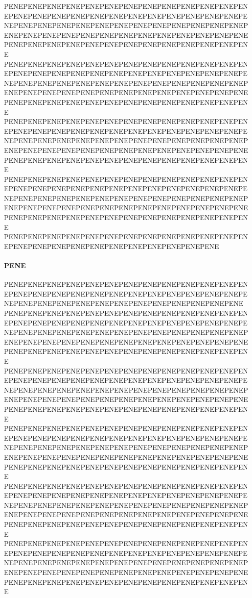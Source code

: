 PENEPENEPENEPENEPENEPENEPENEPENEPENEPENEPENEPENEPENEPENEPENEPENEPENEPENEPENEPENEPENEPENEPENEPENEPENEPENEPENEPENEPENEPENEPENEPENEPENEPENEPENEPENEPENEPENEPENEPENEPENEPENEPENEPENEPENEPENEPENEPENEPENEPENEPENEPENEPENEPENEPENEPENEPENEPENEPENEPENEPENEPENEPENEPENE
PENEPENEPENEPENEPENEPENEPENEPENEPENEPENEPENEPENEPENEPENEPENEPENEPENEPENEPENEPENEPENEPENEPENEPENEPENEPENEPENEPENEPENEPENEPENEPENEPENEPENEPENEPENEPENEPENEPENEPENEPENEPENEPENEPENEPENEPENEPENEPENEPENEPENEPENEPENEPENEPENEPENEPENEPENEPENEPENEPENEPENEPENEPENEPENE
PENEPENEPENEPENEPENEPENEPENEPENEPENEPENEPENEPENEPENEPENEPENEPENEPENEPENEPENEPENEPENEPENEPENEPENEPENEPENEPENEPENEPENEPENEPENEPENEPENEPENEPENEPENEPENEPENEPENEPENEPENEPENEPENEPENEPENEPENEPENEPENEPENEPENEPENEPENEPENEPENEPENEPENEPENEPENEPENEPENEPENEPENEPENEPENE
PENEPENEPENEPENEPENEPENEPENEPENEPENEPENEPENEPENEPENEPENEPENEPENEPENEPENEPENEPENEPENEPENEPENEPENEPENEPENEPENEPENEPENEPENEPENEPENEPENEPENEPENEPENEPENEPENEPENEPENEPENEPENEPENEPENEPENEPENEPENEPENEPENEPENEPENEPENEPENEPENEPENEPENEPENEPENEPENEPENEPENEPENEPENEPENE
PENEPENEPENEPENEPENEPENEPENEPENEPENEPENEPENEPENEPENEPENEPENEPENEPENEPENEPENEPENEPENEPENEPENEPENE\paragraph{PENE}
PENEPENEPENEPENEPENEPENEPENEPENEPENEPENEPENEPENEPENEPENEPENEPENEPENEPENEPENEPENEPENEPENEPENEPENEPENEPENEPENEPENEPENEPENEPENEPENEPENEPENEPENEPENEPENEPENE
PENEPENEPENEPENEPENEPENEPENEPENEPENEPENEPENEPENEPENEPENEPENEPENEPENEPENEPENEPENEPENEPENEPENEPENEPENEPENEPENEPENEPENEPENEPENEPENEPENEPENEPENEPENEPENEPENEPENEPENEPENEPENEPENEPENEPENEPENEPENEPENEPENEPENEPENEPENEPENEPENEPENEPENEPENEPENEPENEPENEPENEPENEPENEPENE
PENEPENEPENEPENEPENEPENEPENEPENEPENEPENEPENEPENEPENEPENEPENEPENEPENEPENEPENEPENEPENEPENEPENEPENEPENEPENEPENEPENEPENEPENEPENEPENEPENEPENEPENEPENEPENEPENEPENEPENEPENEPENEPENEPENEPENEPENEPENEPENEPENEPENEPENEPENEPENEPENEPENEPENEPENEPENEPENEPENEPENEPENEPENEPENE
PENEPENEPENEPENEPENEPENEPENEPENEPENEPENEPENEPENEPENEPENEPENEPENEPENEPENEPENEPENEPENEPENEPENEPENEPENEPENEPENEPENEPENEPENEPENEPENEPENEPENEPENEPENEPENEPENEPENEPENEPENEPENEPENEPENEPENEPENEPENEPENEPENEPENEPENEPENEPENEPENEPENEPENEPENEPENEPENEPENEPENEPENEPENEPENE
PENEPENEPENEPENEPENEPENEPENEPENEPENEPENEPENEPENEPENEPENEPENEPENEPENEPENEPENEPENEPENEPENEPENEPENEPENEPENEPENEPENEPENEPENEPENEPENEPENEPENEPENEPENEPENEPENEPENEPENEPENEPENEPENEPENEPENEPENEPENEPENEPENEPENEPENEPENEPENEPENEPENEPENEPENEPENEPENEPENEPENEPENEPENEPENE
PENEPENEPENEPENEPENEPENEPENEPENEPENEPENEPENEPENEPENEPENEPENEPENEPENEPENEPENEPENEPENEPENEPENEPENEPENEPENEPENEPENEPENEPENEPENEPENEPENEPENEPENEPENEPENEPENEPENEPENEPENEPENEPENEPENEPENEPENEPENEPENEPENEPENEPENEPENEPENEPENEPENEPENEPENEPENEPENEPENEPENEPENEPENEPENE
